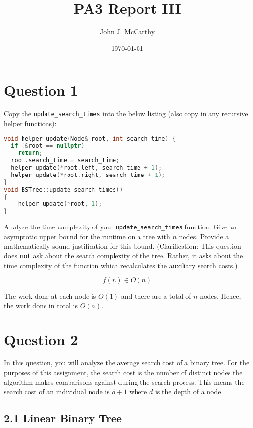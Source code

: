 \documentclass{article}
\title{PA3 Report III}
\author{John J. McCarthy}
\date{\today}
\begin{document}
\maketitle

\section*{Question 1}

\noindent Copy the \verb|update_search_times| into the below listing (also copy in any recursive helper functions):
\begin{lstlisting}[language=c++]
void helper_update(Node& root, int search_time) {
  if (&root == nullptr)
    return;
  root.search_time = search_time;
  helper_update(*root.left, search_time + 1);
  helper_update(*root.right, search_time + 1);
}
void BSTree::update_search_times()
{
    helper_update(*root, 1);
}

\end{lstlisting}

\bigskip

\noindent Analyze the time complexity of your \verb|update_search_times| function. Give an asymptotic upper bound for the runtime on a tree with $n$ nodes. Provide a mathematically sound justification for this bound. (Clarification: This question does \textbf{not} ask about the search complexity of the tree. Rather, it asks about the time complexity of the function which recalculates the auxiliary search costs.)


\begin{equation}
    f(n) \in O(n)
\end{equation}

The work done at each node is $O(1)$ and there are a total of $n$ nodes.
Hence, the work done in total is $O(n)$.

\section*{Question 2}

In this question, you will analyze the average search cost of a binary tree. For the purposes of this assignment, the search cost is the number of distinct nodes the algorithm makes comparisons against during the search process. This means the search cost of an individual node is $d + 1$ where $d$ is the depth of a node.

\subsection*{2.1 Linear Binary Tree}
\end{document}
